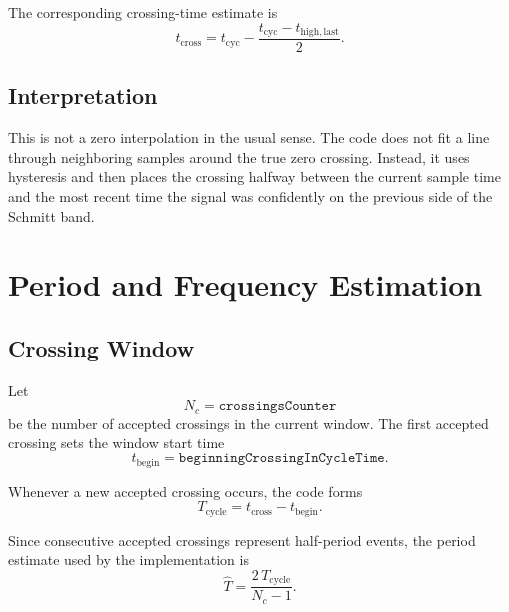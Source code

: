 \documentclass[conference]{IEEEtran}
\begin{document}
    The corresponding crossing-time estimate is
    \begin{equation}
        t_{\mathrm{cross}}
        =
        t_{\mathrm{cyc}}
        - \frac{t_{\mathrm{cyc}} - t_{\mathrm{high,last}}}{2}.
    \end{equation}

    \subsection{Interpretation}

    This is not a zero interpolation in the usual sense. The code does not fit a
    line through neighboring samples around the true zero crossing. Instead, it
    uses hysteresis and then places the crossing halfway between the current
    sample time and the most recent time the signal was confidently on the
    previous side of the Schmitt band.

    \section{Period and Frequency Estimation}

    \subsection{Crossing Window}

    Let
    \begin{equation}
        N_c = \texttt{crossingsCounter}
    \end{equation}
    be the number of accepted crossings in the current window. The first accepted
    crossing sets the window start time
    \begin{equation}
        t_{\mathrm{begin}} = \texttt{beginningCrossingInCycleTime}.
    \end{equation}

    Whenever a new accepted crossing occurs, the code forms
    \begin{equation}
        T_{\mathrm{cycle}} = t_{\mathrm{cross}} - t_{\mathrm{begin}}.
    \end{equation}

    Since consecutive accepted crossings represent half-period events, the period
    estimate used by the implementation is
    \begin{equation}\label{eq:period_est}
    \hat T = \frac{2\,T_{\mathrm{cycle}}}{N_c - 1}.
    \end{equation}
\end{document}
